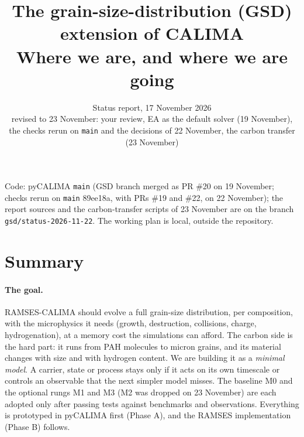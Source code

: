\documentclass[11pt,a4paper]{article}
\title{The grain-size-distribution (GSD) extension of CALIMA\\[3pt]
\large Where we are, and where we are going}
\author{Status report, 17 November 2026\\ \small revised to 23 November: your review, EA as the default solver (19
  November),\\ \small the checks rerun on \texttt{main} and the decisions of 22 November, the carbon transfer (23 November)}
\date{}
\begin{document}
\maketitle
\vspace{-1.5em}
\begin{center}
\small Code: pyCALIMA \texttt{main} (GSD branch merged as PR \#20 on 19 November; checks rerun on \texttt{main}
89ee18a, with PRs \#19 and \#22, on 22 November); the report sources and the carbon-transfer scripts of 23 November are
on the branch \texttt{gsd/status-2026-11-22}. The working plan is local, outside the repository.
\end{center}

\tableofcontents

\section{Summary}

\paragraph{The goal.} RAMSES-CALIMA should evolve a full grain-size distribution, per composition, with the
microphysics it needs (growth, destruction, collisions, charge, hydrogenation), at a memory cost the simulations can
afford. The carbon side is the hard part: it runs from PAH molecules to micron grains, and its material changes with
size and with hydrogen content. We are building it as a \emph{minimal model}. A carrier, state or process stays only if
it acts on its own timescale or controls an observable that the next simpler model misses. The baseline M0 and the optional
rungs M1 and M3 (M2 was dropped on 23 November) are each adopted only after passing tests against benchmarks and
observations. Everything is prototyped in pyCALIMA first
(Phase A), and the RAMSES implementation (Phase B) follows.
\end{document}
